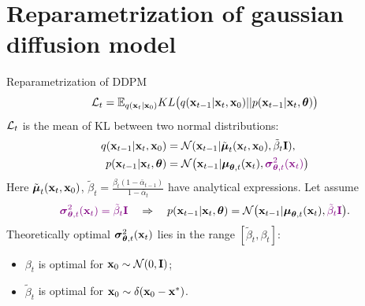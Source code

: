 \section{Reparametrization of gaussian diffusion model}
\begin{frame}{Reparametrization of DDPM}
	\[
		\mathcal{L}_t = \mathbb{E}_{q(\mathbf{x}_t | \mathbf{x}_0)} KL \bigl(q(\mathbf{x}_{t-1} | \mathbf{x}_t, \mathbf{x}_0) || p(\mathbf{x}_{t - 1} | \mathbf{x}_t, \boldsymbol{\theta} )\bigr)
	\]
	$\mathcal{L}_t$ is the mean of KL between two normal distributions:
	\begin{align*}
		q(\mathbf{x}_{t-1} | \mathbf{x}_t, \mathbf{x}_0) &= \mathcal{N}(\mathbf{x}_{t-1} | \tilde{\boldsymbol{\mu}}_t(\mathbf{x}_t, \mathbf{x}_0), \tilde{\beta}_t \mathbf{I}), \\
		p(\mathbf{x}_{t - 1} | \mathbf{x}_t, \boldsymbol{\theta}) &= \mathcal{N} \bigl(\mathbf{x}_{t - 1} | \boldsymbol{\mu}_{\boldsymbol{\theta}, t}(\mathbf{x}_t), {\color{violet}\boldsymbol{\sigma}_{\boldsymbol{\theta}, t}^2(\mathbf{x}_t)}\bigr)
	\end{align*}
	Here $\tilde{\boldsymbol{\mu}}_t(\mathbf{x}_t, \mathbf{x}_0)$, $\tilde{\beta}_t =  \frac{\beta_t (1 - \bar{\alpha}_{t-1})}{1 - \bar{\alpha}_t} $ have analytical expressions.
	Let assume
	\[
		{\color{violet}\boldsymbol{\sigma}_{\boldsymbol{\theta}, t}^2(\mathbf{x}_t) = \tilde{\beta}_t \mathbf{I}} \quad \Rightarrow \quad p(\mathbf{x}_{t - 1} | \mathbf{x}_t, \boldsymbol{\theta}) = \mathcal{N} \bigl(\mathbf{x}_{t - 1} | \boldsymbol{\mu}_{\boldsymbol{\theta}, t}(\mathbf{x}_t), {\color{violet}\tilde{\beta}_t \mathbf{I}} \bigr).
	\]
	Theoretically optimal $\boldsymbol{\sigma}_{\boldsymbol{\theta}, t}^2(\mathbf{x}_t)$ lies in the range $[\tilde{\beta}_t, \beta_t]$:
	\begin{itemize}
		\item $\beta_t$ is optimal for $\mathbf{x}_0 \sim \mathcal{N}(0, \mathbf{I})$;
		\item $\tilde{\beta}_t$ is optimal for $\mathbf{x}_0 \sim \delta(\mathbf{x}_0 - \mathbf{x}^*)$.
	\end{itemize}
	
\end{frame}
